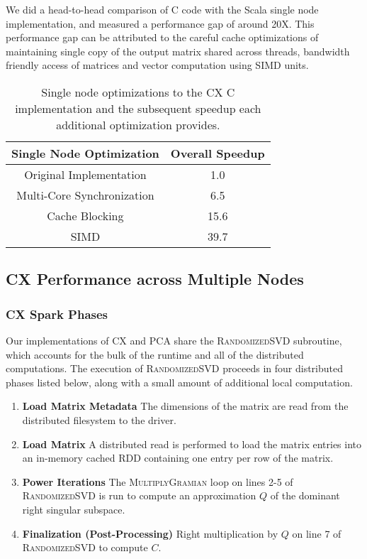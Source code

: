     We did a head-to-head comparison of C code with the Scala single
 node implementation, and measured a performance gap of around 20X.
 This performance gap can be attributed to the careful cache
 optimizations of maintaining single copy of the output matrix shared
 across threads, bandwidth friendly access of matrices and vector
 computation using SIMD units.
 
  \begin{table}
  \begin{center}
  \begin{tabular}{ |c|c| } 
  \hline
  Single Node Optimization & Overall Speedup\\
  \hline
  Original Implementation & 1.0  \\
  Multi-Core Synchronization & 6.5 \\
  Cache Blocking & 15.6 \\
  SIMD & 39.7 \\
  \hline

  \end{tabular}
  \end{center}
  \caption{Single node optimizations to the CX C implementation and
  the subsequent speedup  each additional optimization provides.}
  \label{tab:single_node}
  \end{table}
 



  \subsection{CX Performance across Multiple Nodes}

  \subsubsection{CX Spark Phases}
  Our implementations of CX and PCA share the \textsc{RandomizedSVD} subroutine, which accounts for the bulk of the runtime and all of the distributed computations.
  The execution of \textsc{RandomizedSVD} proceeds in four distributed phases listed below, along with a small amount of additional local computation.
  \begin{enumerate}
      \item \textbf{Load Matrix Metadata}
         The dimensions of the matrix are read from the distributed filesystem to the driver.
      \item \textbf{Load Matrix}
         A distributed read is performed to load the matrix entries into an in-memory cached
         RDD containing one entry per row of the matrix.
      \item \textbf{Power Iterations}
         The \textsc{MultiplyGramian} loop on lines 2-5 of
         \textsc{RandomizedSVD} is run to compute an approximation $Q$
         of the dominant right singular subspace.
       \item \textbf{Finalization (Post-Processing)}
         Right multiplication by $Q$ on line 7 of \textsc{RandomizedSVD} to compute $C$.
  \end{enumerate}

